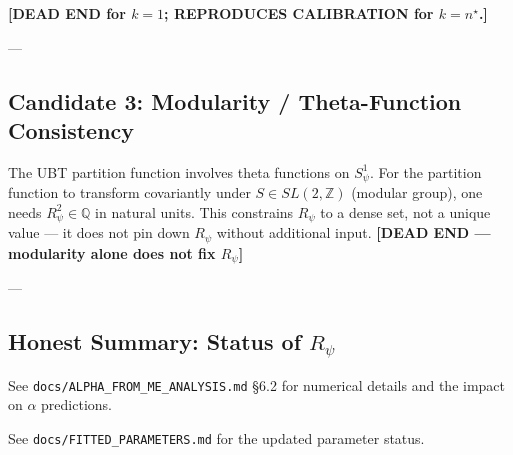\textbf{[DEAD END for $k=1$; REPRODUCES CALIBRATION for $k=n^\star$.]}

---

\subsection{Candidate 3: Modularity / Theta-Function Consistency}

The UBT partition function involves theta functions on $S^1_\psi$.  For the partition
function to transform covariantly under $S\in SL(2,\mathbb{Z})$ (modular group), one
needs $R_\psi^2 \in \mathbb{Q}$ in natural units.  This constrains $R_\psi$ to a
dense set, not a unique value — it does not pin down $R_\psi$ without additional
input.  \textbf{[DEAD END — modularity alone does not fix $R_\psi$]}

---

\subsection{Honest Summary: Status of $R_\psi$}

\begin{center}
\end{center}

\noindent See \texttt{docs/ALPHA\_FROM\_ME\_ANALYSIS.md} §6.2 for numerical details
and the impact on $\alpha$ predictions.

\noindent See \texttt{docs/FITTED\_PARAMETERS.md} for the updated parameter status.
